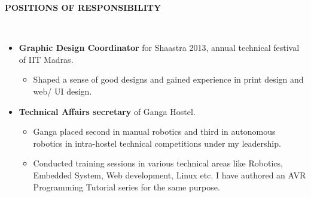 \documentclass[a4paper,10pt]{article}
\newcommand{\lsep}{-0.5cm}
\newcommand{\resheading}[1]{{\small \colorbox{mygrey}{\begin{minipage}{0.975\textwidth}{\textbf{#1 \vphantom{p\^{E}}}}\end{minipage}}}}
\begin{document}
\resheading{\textbf{POSITIONS OF RESPONSIBILITY} }\\[\lsep]
    \begin{itemize}
        \item \textbf{Graphic Design Coordinator} for Shaastra 2013, annual technical festival of 
        IIT Madras.
        \vspace{-5pt}
        \begin{itemize}
            \item Shaped a sense of good designs and gained experience in print design and web/ UI design.
        \end{itemize}
        \vspace{-5pt}
        \item \textbf{Technical Affairs secretary} of Ganga Hostel.
        \vspace{-5pt}
            \begin{itemize}
            \item  Ganga placed second in manual robotics and third in autonomous robotics in intra-hostel technical competitions under my leadership.
            \item Conducted training sessions in various technical areas like Robotics, Embedded System, Web development, Linux etc. I have authored an AVR Programming  Tutorial series for the same purpose.
            \end{itemize}
    \end{itemize}
\end{document}
